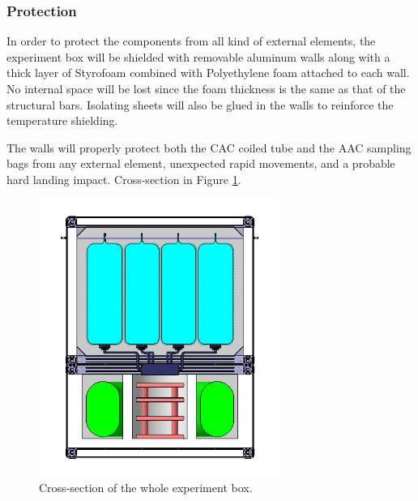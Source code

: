 
\pagebreak
\subsubsection{Protection}

In order to protect the components from all kind of external elements, the experiment box will be shielded with removable aluminum walls along with a thick layer of Styrofoam combined with Polyethylene foam attached to each wall. No internal space will be lost since the foam thickness is the same as that of the structural bars. Isolating sheets will also be glued in the walls to reinforce the temperature shielding. 

The walls will properly protect both the CAC coiled tube and the AAC sampling bags from any external element, unexpected rapid movements, and a probable hard landing impact. Cross-section in Figure \ref{cut_all}. 



\begin{figure}[!ht]
    \centering
    \includegraphics[width=0.7\textwidth]{4-experiment-design/img/tall_frontal.jpg}
    \caption{Cross-section of the whole experiment box.}
    \label{cut_all}
\end{figure}


